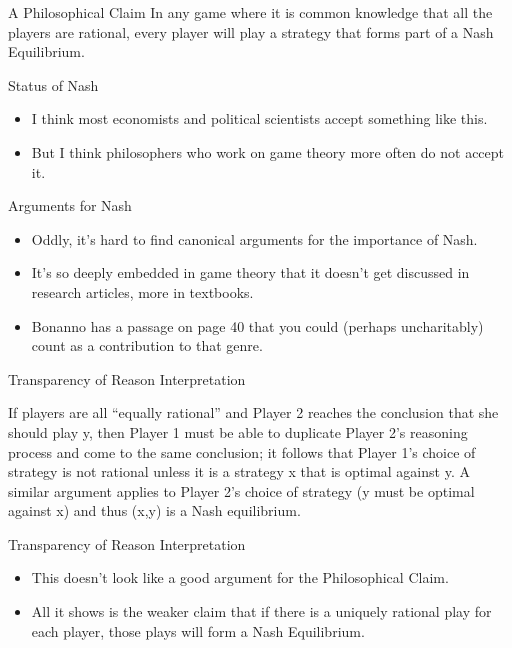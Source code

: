 \documentclass[
  14pt,
  letterpaper,
  ignorenonframetext,
  aspectratio=169,
]{beamer}
\providecommand{\tightlist}{%
  \setlength{\itemsep}{0pt}\setlength{\parskip}{0pt}}\usepackage{longtable,booktabs,array}
\renewenvironment*{quote}	
	{\list{}{\rightmargin   \leftmargin} \item } 	
	{\endlist }
\let\olditem\item
\renewcommand{\item}{%
\olditem\vspace{6pt}}
\begin{document}
\begin{frame}{A Philosophical Claim}
\protect\hypertarget{a-philosophical-claim}{}
In any game where it is common knowledge that all the players are
rational, every player will play a strategy that forms part of a Nash
Equilibrium.
\end{frame}

\begin{frame}{Status of Nash}
\protect\hypertarget{status-of-nash}{}
\begin{itemize}[<+->]
\tightlist
\item
  I think most economists and political scientists accept something like
  this.
\item
  But I think philosophers who work on game theory more often do not
  accept it.
\end{itemize}
\end{frame}

\begin{frame}{Arguments for Nash}
\protect\hypertarget{arguments-for-nash}{}
\begin{itemize}[<+->]
\tightlist
\item
  Oddly, it's hard to find canonical arguments for the importance of
  Nash.
\item
  It's so deeply embedded in game theory that it doesn't get discussed
  in research articles, more in textbooks.
\item
  Bonanno has a passage on page 40 that you could (perhaps uncharitably)
  count as a contribution to that genre.
\end{itemize}
\end{frame}

\begin{frame}{Transparency of Reason Interpretation}
\protect\hypertarget{transparency-of-reason-interpretation}{}
\begin{quote}
If players are all ``equally rational'' and Player 2 reaches the
conclusion that she should play y, then Player 1 must be able to
duplicate Player 2's reasoning process and come to the same conclusion;
it follows that Player 1's choice of strategy is not rational unless it
is a strategy x that is optimal against y. A similar argument applies to
Player 2's choice of strategy (y must be optimal against x) and thus
(x,y) is a Nash equilibrium.
\end{quote}
\end{frame}

\begin{frame}{Transparency of Reason Interpretation}
\protect\hypertarget{transparency-of-reason-interpretation-1}{}
\begin{itemize}[<+->]
\tightlist
\item
  This doesn't look like a good argument for the Philosophical Claim.
\item
  All it shows is the weaker claim that if there is a uniquely rational
  play for each player, those plays will form a Nash Equilibrium.
\end{itemize}
\end{frame}
\end{document}
